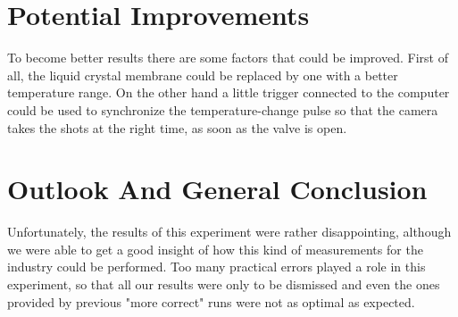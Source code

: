 \section{Potential Improvements}

To become better results there are some factors that could be improved. First of all, the liquid crystal membrane could be replaced by one with a better temperature range. On the other hand a little trigger connected to the computer could be used to synchronize the temperature-change pulse so that the camera takes the shots at the right time, as soon as the valve is open.

\section{Outlook And General Conclusion}

Unfortunately, the results of this experiment were rather disappointing, although we were able to get a good insight of how this kind of measurements for the industry could be performed. Too many practical errors played a role in this experiment, so that all our results were only to be dismissed and even the ones provided by previous "more correct" runs were not as optimal as expected.